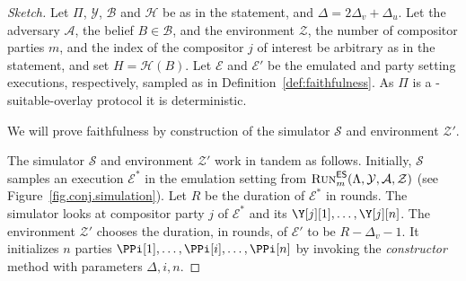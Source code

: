 \begin{proof}[Sketch]
  Let $\Pi$, $\mathcal{Y}$, $\mathcal{B}$ and $\mathcal{H}$
  be as in the statement, and $\Delta =  2 \Delta_v + \Delta_u$.
  Let the adversary $\mathcal{A}$, the belief $B \in \mathcal{B}$,
  and the environment $\mathcal{Z}$, the number of compositor parties $m$,
  and the index of the compositor $j$ of interest be arbitrary
  as in the statement, and set $H = \mathcal{H}(B)$.
  Let $\mathcal{E}$ and $\mathcal{E}'$ be the emulated and party setting
  executions, respectively, sampled as in Definition~\ref{def:faithfulness}.
  As $\Pi$ is a \rollerblade-suitable-overlay protocol it is deterministic.

  We will prove faithfulness by
  construction of the simulator $\mathcal{S}$ and environment $\mathcal{Z}'$.

  The simulator $\mathcal{S}$ and environment $\mathcal{Z}'$ work in tandem
  as follows.
  Initially, $\mathcal{S}$ samples an execution
  $\mathcal{E}^*$ in the emulation setting from
  $\textsc{Run}^{\textsf{ES}}_m(\Lambda,\allowbreak\mathcal{Y},\allowbreak\mathcal{A},\allowbreak\mathcal{Z})$
  (see Figure~\ref{fig.conj.simulation}).
  Let $R$ be the duration of $\mathcal{E}^*$ in rounds.
  The simulator looks at compositor party $j$ of $\mathcal{E}^*$
  and its $\Y[j][1], \ldots, \Y[j][n]$.
  The environment $\mathcal{Z}'$ chooses the duration, in rounds, of
  $\mathcal{E}'$ to be $R - \Delta_v - 1$. It initializes $n$
  parties $\PPi[1], \ldots, \PPi[i], \ldots, \PPi[n]$ by invoking
  the \emph{constructor} method with parameters $\Delta, i, n$.


\end{proof}

